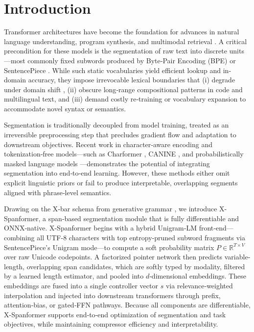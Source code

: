 \section{Introduction}

Transformer architectures have become the foundation for advances in natural language understanding, program synthesis, and multimodal retrieval \cite{vaswani2017attention,devlin2019bert,radford2019gpt2,raffel2020t5}.  A critical precondition for these models is the segmentation of raw text into discrete units—most commonly fixed subwords produced by Byte‐Pair Encoding (BPE) \cite{sennrich2016bpe} or SentencePiece \cite{kudo2018sentencepiece}.  While such static vocabularies yield efficient lookup and in‐domain accuracy, they impose irrevocable lexical boundaries that (i) degrade under domain shift \cite{galle2021respite}, (ii) obscure long‐range compositional patterns in code and multilingual text, and (iii) demand costly re‐training or vocabulary expansion to accommodate novel syntax or semantics.

Segmentation is traditionally decoupled from model training, treated as an irreversible preprocessing step that precludes gradient flow and adaptation to downstream objectives.  Recent work in character‐aware encoding and tokenization‐free models—such as Charformer \cite{tay2021charformer}, CANINE \cite{clark2021canine}, and probabilistically masked language models \cite{liu2022learnedsegmentation,liu2022pmlm}—demonstrates the potential of integrating segmentation into end‐to‐end learning.  However, these methods either omit explicit linguistic priors or fail to produce interpretable, overlapping segments aligned with phrase‐level semantics.

Drawing on the X‐bar schema from generative grammar \cite{jackendoff1977xbar}, we introduce X-Spanformer, a span‐based segmentation module that is fully differentiable and ONNX‐native.  X-Spanformer begins with a hybrid Unigram‐LM front‐end—combining all UTF-8 characters with top entropy‐pruned subword fragments via SentencePiece’s Unigram mode—to compute a soft probability matrix \(P\in\mathbb{R}^{T\times V}\) over raw Unicode codepoints.  A factorized pointer network \cite{vinyals2015pointer} then predicts variable‐length, overlapping span candidates, which are softly typed by modality, filtered by a learned length estimator, and pooled into \(d\)‐dimensional embeddings.  These embeddings are fused into a single controller vector \(s\) via relevance‐weighted interpolation and injected into downstream transformers through prefix, attention‐bias, or gated‐FFN pathways.  Because all components are differentiable, X-Spanformer supports end‐to‐end optimization of segmentation and task objectives, while maintaining compressor efficiency and interpretability.

